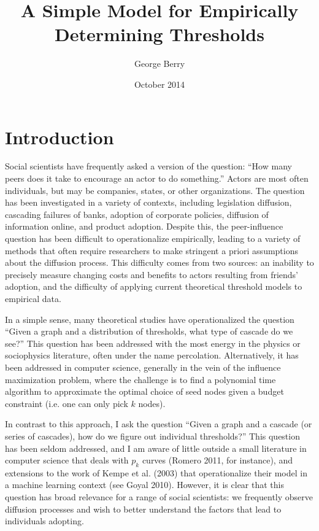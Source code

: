 \documentclass{article}
\title{A Simple Model for Empirically Determining Thresholds}
\author{George Berry}
\date{October 2014}
\begin{document}
\maketitle

\section{Introduction}

Social scientists have frequently asked a version of the question: ``How many peers does it take to encourage an actor to do something.'' Actors are most often individuals, but may be companies, states, or other organizations. The question has been investigated in a variety of contexts, including legislation diffusion, cascading failures of banks, adoption of corporate policies, diffusion of information online, and product adoption. Despite this, the peer-influence question has been difficult to operationalize empirically, leading to a variety of methods that often require researchers to make stringent a priori assumptions about the diffusion process. This difficulty comes from two sources: an inability to precisely measure changing costs and benefits to actors resulting from friends' adoption, and the difficulty of applying current theoretical threshold models to empirical data.

In a simple sense, many theoretical studies have operationalized the question ``Given a graph and a distribution of thresholds, what type of cascade do we see?'' This question has been addressed with the most energy in the physics or sociophysics literature, often under the name percolation. Alternatively, it has been addressed in computer science, generally in the vein of the influence maximization problem, where the challenge is to find a polynomial time algorithm to approximate the optimal choice of seed nodes given a budget constraint (i.e. one can only pick $k$ nodes). 

In contrast to this approach, I ask the question ``Given a graph and a cascade (or series of cascades), how do we figure out individual thresholds?'' This question has been seldom addressed, and I am aware of little outside a small literature in computer science that deals with $p_k$ curves (Romero 2011, for instance), and extensions to the work of Kempe et al. (2003) that operationalize their model in a machine learning context (see Goyal 2010). However, it is clear that this question has broad relevance for a range of social scientists: we frequently observe diffusion processes and wish to better understand the factors that lead to individuals adopting.
\end{document}

